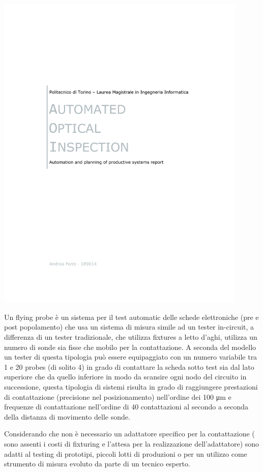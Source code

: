 \includegraphics[clip=true, trim= 50 540 50 120,page=18,width=0.9\textwidth]{materiale/tesina-carlucci.pdf}
		


Un flying probe è un sistema per il test automatic delle schede elettroniche (pre e post popolamento) che 
usa un sistema di misura simile ad un tester in-circuit, a differenza di un tester tradizionale, che utilizza fixtures a letto d’aghi, utilizza un numero di sonde sia fisse che mobilo per la contattazione. 
A seconda del modello un tester di questa tipologia può essere equipaggiato con un numero variabile tra 
1 e 20 probes (di solito 4) in grado di contattare la scheda sotto test sia dal lato superiore che da quello inferiore in modo da scansire ogni nodo del circuito in successione, questa tipologia di sistemi risulta in grado di raggiungere prestazioni di contattazione (precisione nel posizionamento) nell’ordine dei  100 μm e frequenze di contattazione nell’ordine di 40 contattazioni al secondo a seconda della distanza di movimento delle sonde. 

Considerando che non è necessario un adattatore specifico per la contattazione ( sono assenti i costi di 
fixturing e l’attesa per la realizzazione dell’adattatore) sono adatti al testing di prototipi, piccoli lotti di produzioni o per un utilizzo come strumento di misura evoluto da parte di un tecnico esperto.  

